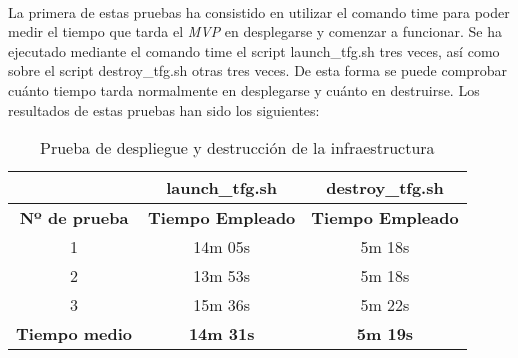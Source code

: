 \documentclass[../../memoria.tex]{subfiles}
\begin{document}
\paragraph{}
La primera de estas pruebas ha consistido en utilizar el comando time \cite{timelinuxcom} para poder medir el tiempo que tarda el \textit{MVP} en desplegarse y comenzar a funcionar. Se ha ejecutado mediante el comando time el script launch\_tfg.sh tres veces, así como sobre el script destroy\_tfg.sh otras tres veces. De esta forma se puede comprobar cuánto tiempo tarda normalmente en desplegarse y cuánto en destruirse. Los resultados de estas pruebas han sido los siguientes:

\begin{table}[H]
    \centering
    \begin{tabular}{c|c|c|}
        \cline{2-3}
        \textbf{}                                   & \textbf{launch\_tfg.sh}  & \textbf{destroy\_tfg.sh} \\ \hline
        \multicolumn{1}{|c|}{\textbf{Nº de prueba}} & \textbf{Tiempo Empleado} & \textbf{Tiempo Empleado} \\ \hline
        \multicolumn{1}{|c|}{1}                     & 14m 05s                  & 5m 18s                   \\ \hline
        \multicolumn{1}{|c|}{2}                     & 13m 53s                  & 5m 18s                   \\ \hline
        \multicolumn{1}{|c|}{3}                     & 15m 36s                  & 5m 22s                   \\ \hline
        \multicolumn{1}{|c|}{\textbf{Tiempo medio}} & \textbf{14m 31s}         & \textbf{5m 19s}          \\ \hline
    \end{tabular}
    \caption{Prueba de despliegue y destrucción de la infraestructura}
    \label{tab:caption}
\end{table}

\end{document}
